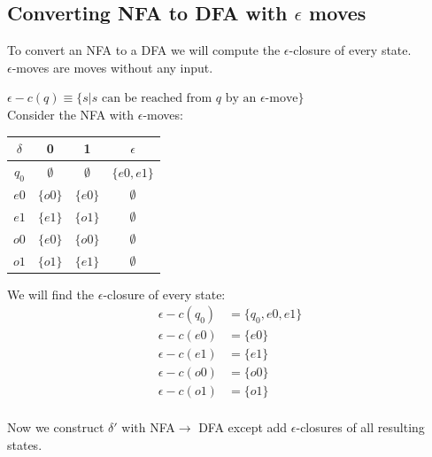 \documentclass{scrartcl}
\begin{document}
%
\subsection{Converting NFA to DFA with $\epsilon$ moves}

To convert an NFA to a DFA we will compute the $\epsilon$-closure of every state.\\

$\epsilon$-moves are moves without any input.

$\epsilon-c(q) \equiv \{s|s \text{ can be reached from } q \text{ by an $\epsilon$-move}\}$\\

Consider the NFA with $\epsilon$-moves:
\begin{center}
\begin{tabular} {|c|c c c|}
\hline
$\delta$&0&1&$\epsilon$\\
\hline
$q_0$ & $\emptyset$ & $\emptyset$ & $\{e0,e1\}$\\
$e0$ & $\{o0\}$ & $\{e0\}$ & $\emptyset$\\
$e1$ & $\{e1\}$ & $\{o1\}$ & $\emptyset$\\
$o0$ & $\{e0\}$ & $\{o0\}$ & $\emptyset$\\
$o1$ & $\{o1\}$ & $\{e1\}$ & $\emptyset$\\
\hline
\end{tabular}
\end{center}

We will find the $\epsilon$-closure of every state:
\begin{align*}
\epsilon-c(q_0) &= \{q_0,e0,e1\}\\
\epsilon-c(e0) &= \{e0\}\\
\epsilon-c(e1) &= \{e1\}\\
\epsilon-c(o0) &= \{o0\}\\
\epsilon-c(o1) &= \{o1\}\\
\end{align*}

Now we construct $\delta'$ with NFA$\rightarrow$ DFA except add $\epsilon$-closures of all resulting states.
\end{document}
